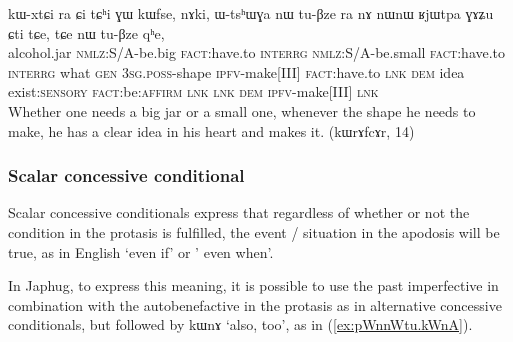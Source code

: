 \documentclass[oldfontcommands,oneside,a4paper,11pt]{article}
\newcommand{\ipa}[1]{{\phon \mbox{#1}}} %
\newcommand{\refb}[1]{(\ref{#1})}
\begin{document}
\begin{exe}
\ex  \label{ex:RjWtpa}
\gll
[\ipa{tɕʰorzi}   	\ipa{kɯ-wxti}   	\ipa{ra}]   	\ipa{ɕi,}   	\ipa{kɯ-xtɕi}   	\ipa{ra}   	\ipa{ɕi}   	\ipa{tɕʰi}   	\ipa{ɣɯ}   	\ipa{kɯfse,}   	\ipa{nɤki,}   	\ipa{ɯ-tsʰɯɣa}   	\ipa{nɯ}   	\ipa{tu-βze}   	\ipa{ra}   	\ipa{nɤ}   	\ipa{nɯnɯ}   	\ipa{ʁjɯtpa}   	\ipa{ɣɤʑu}   	\ipa{ɕti}   	\ipa{tɕe,}   	\ipa{tɕe}   	\ipa{nɯ}   	\ipa{tu-βze}   	\ipa{qʰe,}   \\
alcohol.jar \textsc{nmlz}:S/A-be.big \textsc{fact}:have.to \textsc{interrg} \textsc{nmlz}:S/A-be.small \textsc{fact}:have.to \textsc{interrg} what \textsc{gen} \textsc{3sg.poss}-shape \textsc{ipfv}-make[III]  \textsc{fact}:have.to \textsc{lnk} \textsc{dem} idea
exist:\textsc{sensory} \textsc{fact}:be:\textsc{affirm} \textsc{lnk} \textsc{lnk} \textsc{dem} \textsc{ipfv}-make[III]  \textsc{lnk} \\
\glt Whether one needs a big jar or a small one, whenever the shape he needs to make, he has a clear idea in his heart and makes it. (kɯrɤfcɤr, 14)
\end{exe}
\subsubsection{Scalar concessive conditional}
Scalar concessive conditionals express that regardless of whether or not the condition in the protasis is fulfilled, the event / situation in the apodosis will be true, as in English `even if' or ' even when'.


In Japhug, to express this meaning, it is possible to use the past imperfective in combination with the autobenefactive in the protasis as in alternative concessive conditionals, but followed by \ipa{kɯnɤ} `also, too', as in \refb{ex:pWnnWtu.kWnA}.
\end{document}
